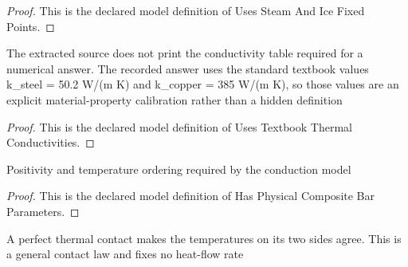 \begin{proof}
  This is the declared model definition of Uses Steam And Ice Fixed Points.
\end{proof}
\begin{definition}
  \label{def:physics:phyx-mini-0467:phyxminiproblems-problemphyxmini0467-usestextbookthermalconductivities}
  The extracted source does not print the conductivity table required for a numerical answer. The recorded answer uses the standard textbook values k\_steel = 50.2 W/(m K) and k\_copper = 385 W/(m K), so those values are an explicit material-property calibration rather than a hidden definition
\end{definition}
\begin{proof}
  This is the declared model definition of Uses Textbook Thermal Conductivities.
\end{proof}
\begin{definition}
  \label{def:physics:phyx-mini-0467:phyxminiproblems-problemphyxmini0467-hasphysicalcompositebarparameters}
  Positivity and temperature ordering required by the conduction model
\end{definition}
\begin{proof}
  This is the declared model definition of Has Physical Composite Bar Parameters.
\end{proof}
\begin{definition}
  \label{def:physics:phyx-mini-0467:phyxminiproblems-problemphyxmini0467-satisfiesperfectthermalcontactlaw}
  A perfect thermal contact makes the temperatures on its two sides agree. This is a general contact law and fixes no heat-flow rate
\end{definition}
